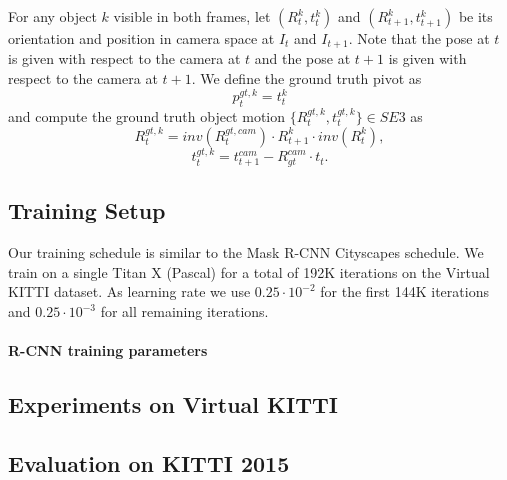 For any object $k$ visible in both frames, let
$(R_t^k, t_t^k)$ and $(R_{t+1}^k, t_{t+1}^k)$ be its orientation and position in camera space
at $I_t$ and $I_{t+1}$. Note that the pose at $t$ is given with respect to the camera at $t$ and
the pose at $t+1$ is given with respect to the camera at $t+1$.
We define the ground truth pivot as
\begin{equation}
p_{t}^{gt, k} = t_t^k
\end{equation}
and compute the ground truth object motion $\{R_t^{gt, k}, t_t^{gt, k}\} \in SE3$ as
\begin{equation}
R_{t}^{gt, k} = inv(R_{t}^{gt, cam}) \cdot R_{t+1}^k \cdot inv(R_t^k),
\end{equation}
\begin{equation}
t_{t}^{gt, k} = t_{t+1}^{cam}  - R_{gt}^{cam} \cdot t_t.
\end{equation} %

\subsection{Training Setup}
Our training schedule is similar to the Mask R-CNN Cityscapes schedule.
We train on a single Titan X (Pascal) for a total of 192K iterations on the Virtual KITTI dataset.
As learning rate we use $0.25 \cdot 10^{-2}$ for the first 144K iterations and $0.25 \cdot 10^{-3}$
for all remaining iterations.

\paragraph{R-CNN training parameters}

\subsection{Experiments on Virtual KITTI}

\subsection{Evaluation on KITTI 2015}
